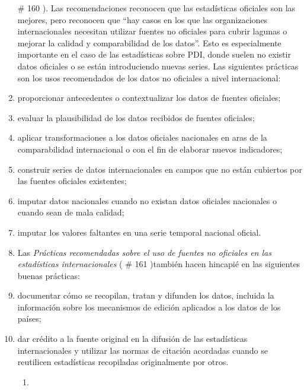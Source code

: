 \documentclass[
]{book}
\begin{document}
\begin{enumerate}
  \# 160
  ). Las recomendaciones reconocen que las estadísticas oficiales son las mejores, pero reconocen que ``hay casos en los que las organizaciones internacionales necesitan utilizar fuentes no oficiales para cubrir lagunas o mejorar la calidad y comparabilidad de los datos''. Esto es especialmente importante en el caso de las estadísticas sobre PDI, donde suelen no existir datos oficiales o se están introduciendo nuevas series. Las siguientes prácticas son los usos recomendados de los datos no oficiales a nivel internacional:
\item
  proporcionar antecedentes o contextualizar los datos de fuentes oficiales;
\item
  evaluar la plausibilidad de los datos recibidos de fuentes oficiales;
\item
  aplicar transformaciones a los datos oficiales nacionales en aras de la comparabilidad internacional o con el fin de elaborar nuevos indicadores;
\item
  construir series de datos internacionales en campos que no están cubiertos por las fuentes oficiales existentes;
\item
  imputar datos nacionales cuando no existan datos oficiales nacionales o cuando sean de mala calidad;
\item
  imputar los valores faltantes en una serie temporal nacional oficial.
\item
  Las \emph{Prácticas recomendadas sobre el uso de fuentes no oficiales en las estadísticas internacionales} (
  \# 161
  )también hacen hincapié en las siguientes buenas prácticas:
\item
  documentar cómo se recopilan, tratan y difunden los datos, incluida la información sobre los mecanismos de edición aplicados a los datos de los países;
\item
  dar crédito a la fuente original en la difusión de las estadísticas internacionales y utilizar las normas de citación acordadas cuando se reutilicen estadísticas recopiladas originalmente por otros.

  \begin{enumerate}
  \def\labelenumii{\arabic{enumii}.}
  \item ~
    \hypertarget{recopilaciuxf3n-de-estaduxedsticas-para-comparaciones-internacionales}{%
}
\end{enumerate}
\end{enumerate}
\end{document}
